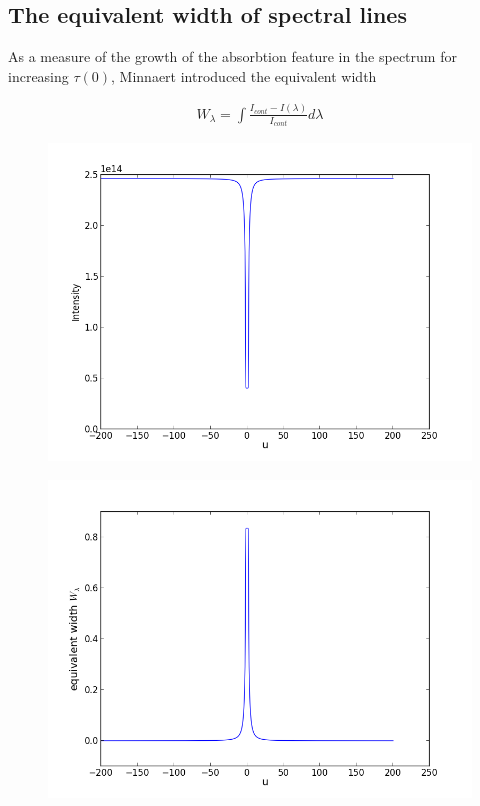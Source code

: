 \documentclass[norsk,a4paper,12pt]{article}
\begin{document}
\subsection{The equivalent width of spectral lines}
As a measure of the growth of the absorbtion feature in the spectrum for increasing $\tau(0)$, Minnaert introduced 
the equivalent width

\begin{align*}
W_{\lambda} = \int \frac{I_{cont} - I(\lambda)}{I_{cont}} d\lambda
\end{align*} 

\begin{figure}[H] 
\begin{center} 
\includegraphics[scale=0.5]{ssa34_1.png} 
 

\caption{} 
\end{center} 
\end{figure}


\begin{figure}[H] 
\begin{center} 
\includegraphics[scale=0.5]{ssa34_2.png} 
 

\caption{} 
\end{center} 
\end{figure}
\end{document}
